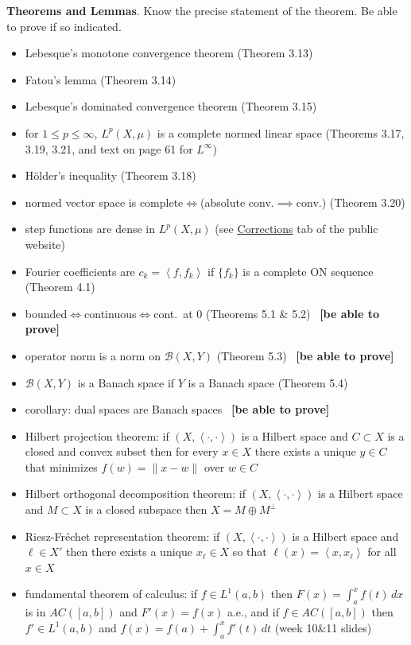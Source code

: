 \documentclass[12pt]{amsart}
\newcommand{\normalspacing}{\renewcommand{\baselinestretch}{1.1}\tiny\normalsize}
\newcommand{\ip}[2]{\left<#1,#2\right>}
\begin{document}
\normalspacing
\medskip
\noindent \textbf{Theorems and Lemmas}.  Know the precise statement of the theorem.  Be able to prove if so indicated.
\newcommand{\bap}{\, {\small\textbf{[be able to prove]}}}
\begin{itemize}
\item Lebesque's monotone convergence theorem (Theorem 3.13)
\item Fatou's lemma (Theorem 3.14)
\item Lebesque's dominated convergence theorem (Theorem 3.15)
\item for $1\le p \le \infty$, $L^p(X,\mu)$ is a complete normed linear space (Theorems 3.17, 3.19, 3.21, and text on page 61 for $L^\infty$)
\item H\"older's inequality (Theorem 3.18)
\item normed vector space is complete$\iff$(absolute conv.$\implies$conv.) (Theorem 3.20)
\item step functions are dense in $L^p(X,\mu)$ (see \href{https://bueler.github.io/fa/corrections.html}{Corrections} tab of the public website)
\item Fourier coefficients are $c_k=\ip{f}{f_k}$ if $\{f_k\}$ is a complete ON sequence (Theorem 4.1)
\item bounded$\iff$continuous$\iff$cont.~at 0 (Theorems 5.1 \& 5.2) \bap
\item operator norm is a norm on $\mathcal{B}(X,Y)$ (Theorem 5.3) \bap
\item $\mathcal{B}(X,Y)$ is a Banach space if $Y$ is a Banach space (Theorem 5.4)
\item corollary: dual spaces are Banach spaces \bap
\item Hilbert projection theorem: if $(X,\ip{\cdot}{\cdot})$ is a Hilbert space and $C\subset X$ is a closed and convex subset then for every $x\in X$ there exists a unique $y\in C$ that minimizes $f(w)=\|x-w\|$ over $w\in C$
\item Hilbert orthogonal decomposition theorem: if $(X,\ip{\cdot}{\cdot})$ is a Hilbert space and $M\subset X$ is a closed subspace then $X = M\oplus M^{\perp}$
\item Riesz-Fr\'echet representation theorem: if $(X,\ip{\cdot}{\cdot})$ is a Hilbert space and $\ell\in X'$ then there exists a unique $x_\ell\in X$ so that $\ell(x) = \ip{x}{x_\ell}$ for all $x\in X$
\item fundamental theorem of calculus: if $f\in L^1(a,b)$ then $F(x)=\int_a^x f(t)\,dx$ is in $AC([a,b])$ and $F'(x)=f(x)$ a.e., and if $f \in AC([a,b])$ then $f'\in L^1(a,b)$ and $f(x) = f(a) + \int_a^x f'(t)\,dt$ (week 10\&11 slides)

\end{itemize}
\end{document}
